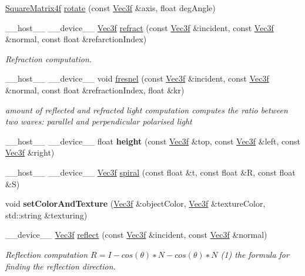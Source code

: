 \begin{DoxyCompactItemize}
\item 
\hyperlink{class_square_matrix4}{Square\+Matrix4f} \hyperlink{group__linear__algebra_gac7b995c759cd539cf455cae62c4184e6}{rotate} (const \hyperlink{class_vec3}{Vec3f} \&axis, float deg\+Angle)
\item 
\+\_\+\+\_\+host\+\_\+\+\_\+ \+\_\+\+\_\+device\+\_\+\+\_\+ \hyperlink{class_vec3}{Vec3f} \hyperlink{group__linear__algebra_ga9f88dab197e2bd7e0940faf4fd447465}{refract} (const \hyperlink{class_vec3}{Vec3f} \&incident, const \hyperlink{class_vec3}{Vec3f} \&normal, const float \&refarction\+Index)
\begin{DoxyCompactList}\small\item\em Refraction computation. \end{DoxyCompactList}\item 
\+\_\+\+\_\+host\+\_\+\+\_\+ \+\_\+\+\_\+device\+\_\+\+\_\+ void \hyperlink{group__linear__algebra_ga02c442d21d81c8d0cf889f830eddc236}{fresnel} (const \hyperlink{class_vec3}{Vec3f} \&incident, const \hyperlink{class_vec3}{Vec3f} \&normal, const float \&refraction\+Index, float \&kr)\hypertarget{group__linear__algebra_ga02c442d21d81c8d0cf889f830eddc236}{}\label{group__linear__algebra_ga02c442d21d81c8d0cf889f830eddc236}

\begin{DoxyCompactList}\small\item\em amount of reflected and refracted light computation  computes the ratio between two waves\+: parallel and perpendicular polarised light \end{DoxyCompactList}\item 
\+\_\+\+\_\+host\+\_\+\+\_\+ \+\_\+\+\_\+device\+\_\+\+\_\+ float {\bfseries height} (const \hyperlink{class_vec3}{Vec3f} \&top, const \hyperlink{class_vec3}{Vec3f} \&left, const \hyperlink{class_vec3}{Vec3f} \&right)\hypertarget{group__linear__algebra_gad27b722eda4f769baea62a2fae211b20}{}\label{group__linear__algebra_gad27b722eda4f769baea62a2fae211b20}

\item 
\+\_\+\+\_\+host\+\_\+\+\_\+ \+\_\+\+\_\+device\+\_\+\+\_\+ \hyperlink{class_vec3}{Vec3f} \hyperlink{group__linear__algebra_gac9237c364274b9a0fbb9184fae573357}{spiral} (const float \&t, const float \&R, const float \&S)
\item 
void {\bfseries set\+Color\+And\+Texture} (\hyperlink{class_vec3}{Vec3f} \&object\+Color, \hyperlink{class_vec3}{Vec3f} \&texture\+Color, std\+::string \&texturing)\hypertarget{group__linear__algebra_gad9214d8b1430de7ca564900714f22194}{}\label{group__linear__algebra_gad9214d8b1430de7ca564900714f22194}

\item 
\+\_\+\+\_\+device\+\_\+\+\_\+ \hyperlink{class_vec3}{Vec3f} \hyperlink{group__linear__algebra_ga3f0e69590f012ccde6215b3e5ccd1615}{reflect} (const \hyperlink{class_vec3}{Vec3f} \&incident, const \hyperlink{class_vec3}{Vec3f} \&normal)
\begin{DoxyCompactList}\small\item\em Reflection computation $ R = I − cos(θ)∗N − cos(θ)∗N $ (1) the formula for finding the reflection direction. \end{DoxyCompactList}\end{DoxyCompactItemize}

